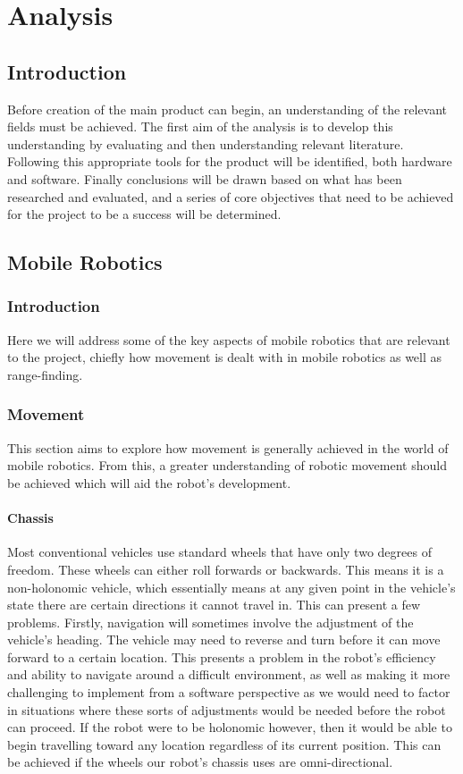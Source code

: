 \part{Analysis}
		\chapter{Introduction}
		Before creation of the main product can begin, an understanding of the relevant fields must be achieved. The first aim of the analysis is to develop this understanding by evaluating and then understanding relevant literature. Following this appropriate tools for the product will be identified, both hardware and software. Finally conclusions will be drawn based on what has been researched and evaluated, and a series of core objectives that need to be achieved for the project to be a success will be determined.
		
		\chapter{Mobile Robotics}
			\section{Introduction}
			Here we will address some of the key aspects of mobile robotics that are relevant to the project, chiefly how movement is dealt with in mobile robotics as well as range-finding.
			
			\section{Movement}
			This section aims to explore how movement is generally achieved in the world of mobile robotics. From this, a greater understanding of robotic movement should be achieved which will aid the robot's development.
			
				\subsection{Chassis}
				Most conventional vehicles use standard wheels that have only two degrees of freedom. These wheels can either roll forwards or backwards. This means it is a non-holonomic vehicle, which essentially means at any given point in the vehicle's state there are certain directions it cannot travel in. This can present a few problems. Firstly, navigation will sometimes involve the adjustment of the vehicle's heading. The vehicle may need to reverse and turn before it can move forward to a certain location. This presents a problem in the robot's efficiency and ability to navigate around a difficult environment, as well as making it more challenging to implement from a software perspective as we would need to factor in situations where these sorts of adjustments would be needed before the robot can proceed. If the robot were to be holonomic however, then it would be able to begin travelling toward any location regardless of its current position. This can be achieved if the wheels our robot's chassis uses are omni-directional.	
				
